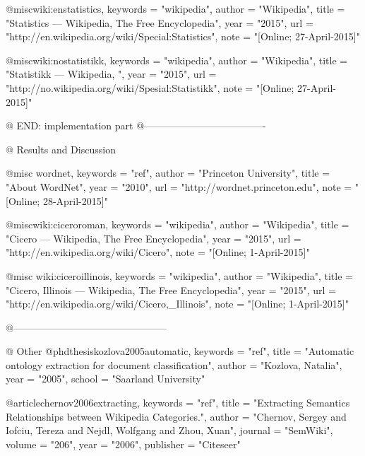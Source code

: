 @misc{wiki:enstatistics,
    keywords    =   "wikipedia",
    author      =   "Wikipedia",
    title       =   "Statistics --- Wikipedia{,} The Free Encyclopedia",
    year        =   "2015",
    url         =   "http://en.wikipedia.org/wiki/Special:Statistics",
    note        =   "[Online; 27-April-2015]"
} 
 
@misc{wiki:nostatistikk,
    keywords    =   "wikipedia",
    author      =   "Wikipedia",
    title       =   "Statistikk --- Wikipedia{,} ",
    year        =   "2015",
    url         =   "http://no.wikipedia.org/wiki/Spesial:Statistikk",
    note        =   "[Online; 27-April-2015]"
}
 

@ END: implementation part 
@-------------------------------------

@ Results and Discussion

@misc{ wordnet,
    keywords    =   "ref",
    author      =   "Princeton University",
    title       =   "About WordNet",
    year        =   "2010",
    url         =   "http://wordnet.princeton.edu",
    note        =   "[Online; 28-April-2015]"
}

@misc{wiki:ciceroroman,
    keywords    =   "wikipedia",
    author      =   "Wikipedia",
    title       =   "Cicero --- Wikipedia{,} The Free Encyclopedia",
    year        =   "2015",
    url         =   "http://en.wikipedia.org/wiki/Cicero",
    note        =   "[Online; 1-April-2015]"
} 

@misc{ wiki:ciceroillinois,
    keywords    =   "wikipedia",
    author      =   "Wikipedia",
    title       =   "Cicero, Illinois --- Wikipedia{,} The Free Encyclopedia",
    year        =   "2015",
    url         =   "http://en.wikipedia.org/wiki/Cicero,_Illinois",
    note        =   "[Online; 1-April-2015]"
} 




@-----------------------------------------------

@ Other
@phdthesis{kozlova2005automatic,
    keywords    =   "ref",
    title       =   "Automatic ontology extraction for document classification",
    author      =   "Kozlova, Natalia",
    year        =   "2005",
    school      =   "Saarland University"
}

@article{chernov2006extracting,
    keywords    =   "ref",
    title       =   "Extracting Semantics Relationships between Wikipedia Categories.",
    author      =   "Chernov, Sergey and Iofciu, Tereza and Nejdl, Wolfgang and Zhou, Xuan",
    journal     =   "SemWiki",
    volume      =   "206",
    year        =   "2006",
    publisher   =   "Citeseer"
}
